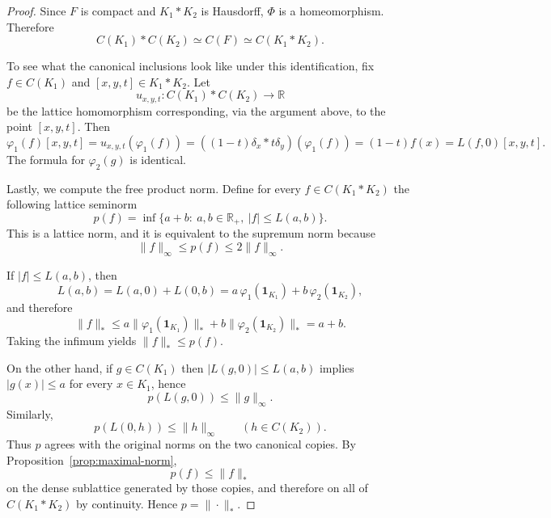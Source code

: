 \documentclass[10pt,a4paper]{amsart}
\newcommand{\one}{\mathbf{1}}
\begin{document}
\begin{proof}
Since $F$ is compact and $K_1\ast K_2$ is Hausdorff, $\Phi$ is a homeomorphism. Therefore
\[
C(K_1)\ast C(K_2)\simeq C(F)\simeq C(K_1\ast K_2).
\]

To see what the canonical inclusions look like under this identification, fix $f\in C(K_1)$ and $[x,y,t]\in K_1\ast K_2$. Let
\[
u_{x,y,t}:C(K_1)\ast C(K_2)\to \mathbb{R}
\]
be the lattice homomorphism corresponding, via the argument above, to the point $[x,y,t]$. Then
\[
\varphi_1(f)[x,y,t]
=u_{x,y,t}(\varphi_1(f))
=((1-t)\delta_x\ast t\delta_y)(\varphi_1(f))
=(1-t)f(x)
=L(f,0)[x,y,t].
\]
The formula for $\varphi_2(g)$ is identical.

Lastly, we compute the free product norm. Define for every $f\in C(K_1*K_2)$ the following lattice seminorm
\[
p(f)=\inf\Big\{a+b:\ a,b\in\mathbb R_+,\ |f|\leq L(a,b)\Big\}.
\]
This is a lattice norm, and it is equivalent to the supremum norm because
\[
\|f\|_\infty\leq p(f)\leq 2\|f\|_\infty.
\]

If $|f|\leq L(a,b)$, then
\[
L(a,b)=L(a,0)+L(0,b)=a\,\varphi_1(\one_{K_1})+b\,\varphi_2(\one_{K_2}),
\]
and therefore
\[
\|f\|_{\ast}\leq a\|\varphi_1(\one_{K_1})\|_{\ast}+b\|\varphi_2(\one_{K_2})\|_{\ast}=a+b.
\]
Taking the infimum yields $\|f\|_{\ast}\leq p(f)$.

On the other hand, if $g\in C(K_1)$ then $|L(g,0)|\leq L(a,b)$ implies $|g(x)|\leq a$ for every $x\in K_1$, hence
\[
p(L(g,0))\leq\|g\|_\infty.
\]
Similarly,
\[
p(L(0,h))\leq\|h\|_\infty
\qquad (h\in C(K_2)).
\]
Thus $p$ agrees with the original norms on the two canonical copies. By Proposition~\ref{prop:maximal-norm},
\[
p(f)\leq \|f\|_{\ast}
\]
on the dense sublattice generated by those copies, and therefore on all of $C(K_1\ast K_2)$ by continuity. Hence $p=\|\cdot\|_{\ast}$.
\end{proof}
\end{document}
